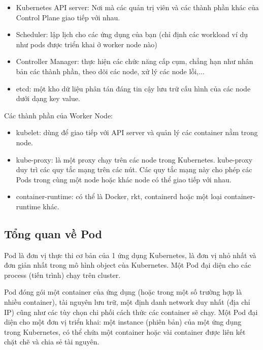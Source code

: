 \documentclass[12pt,a4paper]{report}
\begin{document}
				\begin{itemize}				
					\item Kubernetes API server: Nơi mà các quản trị viên và các thành phần khác của Control Plane giao tiếp với nhau.
					\item Scheduler: lập lịch cho các ứng dụng của bạn (chỉ định các workload ví dụ như pods được triển khai ở worker node nào)
					\item  Controller Manager: thực hiện các chức năng cấp cụm, chẳng hạn như nhân bản các thành phần, theo dõi các node, xử lý các node lỗi,...
					\item etcd: một kho dữ liệu phân tán đáng tin cậy lưu trữ cấu hình của các node dưới dạng key value.
				\end{itemize}
			
				{\hspace{0.3cm}Các thành phần của Worker Node:\\}
				
				\begin{itemize}				
					\item kubelet: dùng để giao tiếp với API server và quản lý các container nằm trong node.
					\item kube-proxy: là một proxy chạy trên các node trong  Kubernetes. kube-proxy duy trì các quy tắc mạng trên các nút. Các quy tắc mạng này cho phép các Pods trong cùng một node hoặc khác node có thể giao tiếp với nhau.
					\item container-runtime: có thể là Docker, rkt, containerd hoặc một loại container-runtime khác.
				\end{itemize}
			
			\subsection{Tổng quan về Pod}
				{\hspace{0.6cm}Pod là đơn vị thực thi cơ bản của 1 ứng dụng Kubernetes, là đơn vị nhỏ nhất và đơn giản nhất trong mô hình object của Kubernetes. Một Pod đại diện cho các process (tiến trình) chạy trên cluster.\\}
				
				Pod đóng gói một container của ứng dụng (hoặc trong một số trường hợp là nhiều container), tài nguyên lưu trữ, một định danh network duy nhất (địa chỉ IP) cũng như các tùy chọn chi phối cách thức các container sẽ chạy. Một Pod đại diện cho một đơn vị triển khai: một instance (phiên bản) của một ứng dụng trong Kubernetes, có thể chứa một container hoặc vài container được liên kết chặt chẽ và chia sẻ tài nguyên.\\
				
\end{document}
